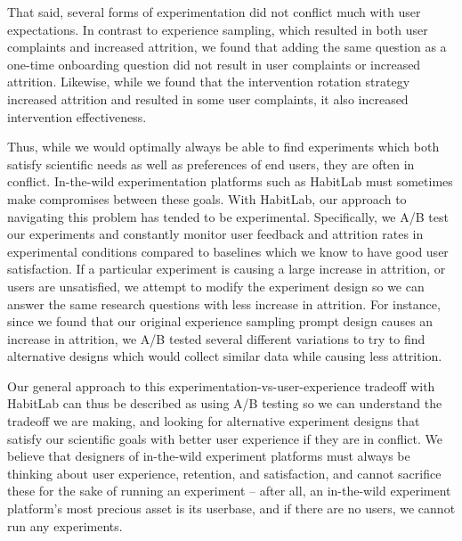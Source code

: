 That said, several forms of experimentation did not conflict much with user expectations. In contrast to experience sampling, which resulted in both user complaints and increased attrition, we found that adding the same question as a one-time onboarding question did not result in user complaints or increased attrition. Likewise, while we found that the intervention rotation strategy increased attrition and resulted in some user complaints, it also increased intervention effectiveness.

Thus, while we would optimally always be able to find experiments which both satisfy scientific needs as well as preferences of end users, they are often in conflict. In-the-wild experimentation platforms such as HabitLab must sometimes make compromises between these goals. With HabitLab, our approach to navigating this problem has tended to be experimental. Specifically, we A/B test our experiments and constantly monitor user feedback and attrition rates in experimental conditions compared to baselines which we know to have good user satisfaction. If a particular experiment is causing a large increase in attrition, or users are unsatisfied, we attempt to modify the experiment design so we can answer the same research questions with less increase in attrition. For instance, since we found that our original experience sampling prompt design causes an increase in attrition, we A/B tested several different variations to try to find alternative designs which would collect similar data while causing less attrition.

Our general approach to this experimentation-vs-user-experience tradeoff with HabitLab can thus be described as using A/B testing so we can understand the tradeoff we are making, and looking for alternative experiment designs that satisfy our scientific goals with better user experience if they are in conflict. We believe that designers of in-the-wild experiment platforms must always be thinking about user experience, retention, and satisfaction, and cannot sacrifice these for the sake of running an experiment -- after all, an in-the-wild experiment platform's most precious asset is its userbase, and if there are no users, we cannot run any experiments.

